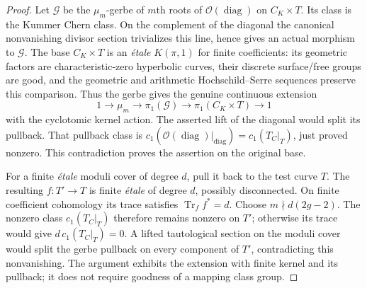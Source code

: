 \begin{proof}
Let $\mathcal G$ be the $\mu_m$-gerbe of $m$th roots of
$\mathcal O(\operatorname{diag})$ on $C_K\times T$.
Its class is the Kummer Chern class.  On the complement of the
diagonal the canonical nonvanishing divisor section trivializes
this line, hence gives an actual morphism to $\mathcal G$.
The base $C_K\times T$ is an \emph{\'etale} $K(\pi,1)$ for finite
coefficients: its geometric factors are characteristic-zero
hyperbolic curves, their discrete surface/free groups are good, and
the geometric and arithmetic Hochschild--Serre sequences preserve
this comparison.  Thus the gerbe gives the genuine continuous
extension
\[
 1\to\mu_m\to\pi_1(\mathcal G)\to
                \pi_1(C_K\times T)\to1
\]
with the cyclotomic kernel action.  The asserted lift of the diagonal
would split its pullback.  That pullback class is
$c_1(\mathcal O(\operatorname{diag})|_{\operatorname{diag}})
=c_1(T_C|_T)$, just proved nonzero.  This contradiction proves the
assertion on the original base.

For a finite \emph{\'etale} moduli cover of degree $d$, pull it back
to the test curve $T$.  The resulting $f:T'\to T$ is finite
\emph{\'etale} of degree $d$, possibly disconnected.  On finite
coefficient cohomology its trace satisfies
$\operatorname{Tr}_f f^*=d$.  Choose $m\nmid d(2g-2)$.
The nonzero class $c_1(T_C|_T)$ therefore remains nonzero on $T'$;
otherwise its trace would give $d\,c_1(T_C|_T)=0$.
A lifted tautological section on the moduli cover would split the
gerbe pullback on every component of $T'$, contradicting this
nonvanishing.  The argument exhibits the extension with finite
kernel and its pullback; it does not require goodness of a mapping
class group.
\end{proof}

